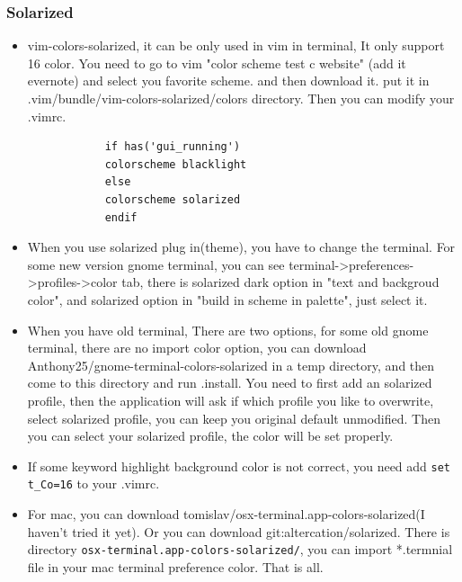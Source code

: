 \documentclass[paper=8.5in:11in, twoside, 12pt, pagesize=pdftex]{book}
\begin{document}
	\subsubsection{Solarized}
	\begin{itemize}
		\item vim-colors-solarized, it can be only used in vim in terminal, It only support 16 color. You need to go to  vim "color scheme test c website" (add it evernote) and select you favorite scheme. and then download it. put it in .vim/bundle/vim-colors-solarized/colors directory. Then you can modify your .vimrc.
		
		\begin{verbatim}
			if has('gui_running')
			colorscheme blacklight
			else
			colorscheme solarized
			endif 
		\end{verbatim}
		\item When you use solarized plug in(theme), you have to change the terminal. For some new version gnome terminal, you can see terminal->preferences->profiles->color tab, there is solarized dark option in "text and backgroud color", and solarized option in "build in scheme in palette", just select it.
		
		\item When you have old terminal, There are two options, for some old gnome terminal, there are no import color option, you can download Anthony25/gnome-terminal-colors-solarized in a temp directory, and then come to this directory and run .install. You need to first add an solarized profile, then the application will ask if which profile you like to overwrite, select solarized profile, you can keep you original default unmodified. Then you can select your solarized profile, the color will be set properly. 
		
		\item If some keyword highlight background color is not correct, you need add \verb!set t_Co=16! to your .vimrc. 
		
		\item For mac, you can download tomislav/osx-terminal.app-colors-solarized(I haven't tried it yet). Or you can download git:altercation/solarized. There is directory \verb!osx-terminal.app-colors-solarized/!, you can import *.termnial file in your mac terminal preference color. That is all.
	\end{itemize}
	
\end{document}
